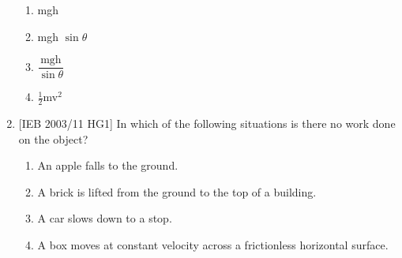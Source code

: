 \begin{eocexercises}{}
\begin{enumerate}
{\begin{enumerate}
\item{mgh}
\item{mgh $\sin \theta$}
\item{$\dfrac{\textrm{mgh}}{\sin \theta}$}
\item{$\tfrac{1}{2}$mv$^2$}
\end{enumerate}}

\item{[IEB 2003/11 HG1] In which of the following situations is there no work done on the object?

\begin{enumerate}
\item{An apple falls to the ground.}
\item{A brick is lifted from the ground to the top of a building.}
\item{A car slows down to a stop.}
\item{A box moves at constant velocity across a frictionless horizontal surface.}
\end{enumerate}
}

\end{enumerate}



\end{eocexercises}





